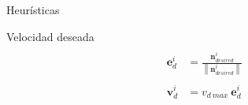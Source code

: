 \begin{frame}{Heurísticas}
    \begin{block}{Velocidad deseada}
        \begin{equation*}
            \begin{aligned}
                \\
                \mathbf{e}_{d}^i &= \frac{\mathbf{n}_{desired}^i}{\left\| \mathbf{n}_{desired}^i \right\|} \\
                \\
                \mathbf{v}_{d}^i &= v_{d\ max}\ \mathbf{e}_{d}^i
            \end{aligned}
        \end{equation*}
    \end{block}
\end{frame}




